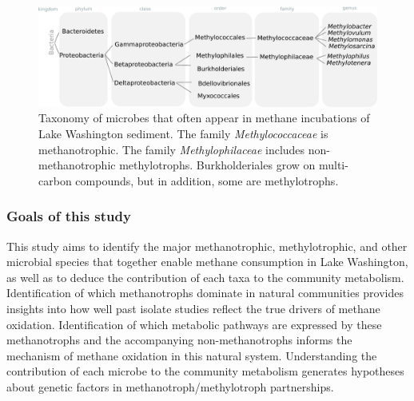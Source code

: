 \begin{figure}[H]
\centering
    \includegraphics[width=1.0\textwidth]{./tex/chapter2/figures/170311_taxonomy_overview.pdf}
    \begin{singlespace}
    \caption[Taxonomy of microbes known to factor into methane oxidation in Lake Washington sediment]{
       Taxonomy of microbes that often appear in methane incubations of Lake Washington sediment.
       The family \textit{Methylococcaceae} is methanotrophic.
       The family \textit{Methylophilaceae} includes non-methanotrophic methylotrophs.
       Burkholderiales grow on multi-carbon compounds, but in addition, some are methylotrophs.}
    \label{fig:taxonomy}
    \end{singlespace}
\end{figure}

\subsubsection{Goals of this study}
This study aims to identify the major methanotrophic, methylotrophic, and other microbial species that together enable methane consumption in Lake Washington, as well as to deduce the contribution of each taxa to the community metabolism.
Identification of which methanotrophs dominate in natural communities provides insights into how well past isolate studies reflect the true drivers of methane oxidation.
Identification of which metabolic pathways are expressed by these methanotrophs and the accompanying non-methanotrophs informs the mechanism of methane oxidation in this natural system.
Understanding the contribution of each microbe to the community metabolism generates hypotheses about genetic factors in methanotroph/methylotroph partnerships.


